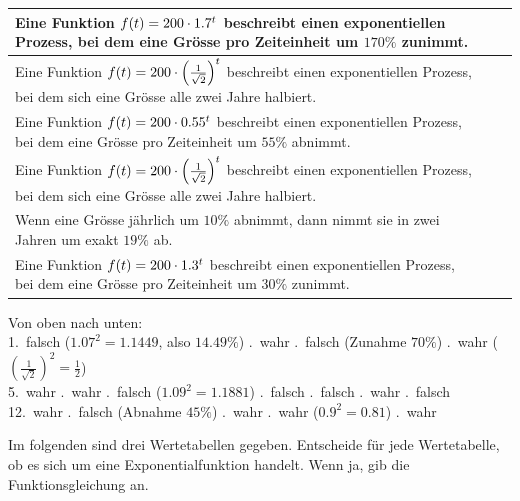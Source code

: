 \documentclass[11pt]{exam}
\begin{document}
\begin{questions}
\begin{table}[h]
\begin{tabular}{|p{12cm}|c|c|}
        Eine Funktion $f(t)=200\cdot1.7^t$ beschreibt einen exponentiellen Prozess, bei dem eine Grösse pro Zeiteinheit um $170\%$ zunimmt. & & \\\hline
        Eine Funktion $f(t)=200\cdot\left(\frac{1}{\sqrt{2}}\right)^t$ beschreibt einen exponentiellen Prozess, bei dem sich eine Grösse alle zwei Jahre halbiert. & & \\\hline
        Eine Funktion $f(t)=200\cdot0.55^t$ beschreibt einen exponentiellen Prozess, bei dem eine Grösse pro Zeiteinheit um $55\%$ abnimmt. & & \\\hline
        Eine Funktion $f(t)=200\cdot\left(\frac{1}{\sqrt{2}}\right)^t$ beschreibt einen exponentiellen Prozess, bei dem sich eine Grösse alle zwei Jahre halbiert. & & \\\hline
        Wenn eine Grösse jährlich um $10\%$ abnimmt, dann nimmt sie in zwei Jahren um exakt $19\%$ ab. & & \\\hline
        Eine Funktion $f(t)=200\cdot1.3^t$ beschreibt einen exponentiellen Prozess, bei dem eine Grösse pro Zeiteinheit um $30\%$ zunimmt. & & \\\hline
    \end{tabular}
\end{table}
\endgroup
{}
{\begin{solution}
		Von oben nach unten:\\
		1.~falsch ($1.07^2=1.1449$, also $14.49\%$) .~wahr .~falsch (Zunahme $70\%$) .~wahr ($\left(\frac{1}{\sqrt{2}}\right)^2=\frac{1}{2}$)\\
		5.~wahr .~wahr .~falsch ($1.09^2=1.1881$) .~falsch .~falsch .~wahr .~falsch\\
		12.~wahr .~falsch (Abnahme $45\%$) .~wahr .~wahr ($0.9^2=0.81$) .~wahr
\end{solution}}
{}






\question[3]
Im folgenden sind drei Wertetabellen gegeben. Entscheide für jede Wertetabelle, ob es sich um eine Exponentialfunktion handelt. Wenn ja, gib die Funktionsgleichung an.
\end{questions}
\end{document}

